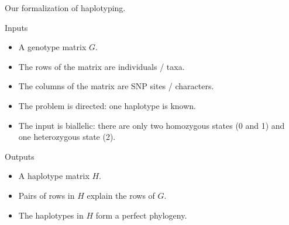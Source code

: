 \documentclass{beamer}
\begin{document}
\begin{frame}[t]{Our formalization of haplotyping.}
  \begin{block}{Inputs}
    \begin{itemize}
    \item A genotype matrix $G$.
    \item The rows of the matrix are individuals / taxa.
    \item The columns of the matrix are SNP sites / characters.
    \item<alert@1->
      The problem is directed: one haplotype is known.
    \item<alert@1->
      The input is biallelic: there are only two homozygous
      states (0 and 1) and one heterozygous state (2).
    \end{itemize}
  \end{block}
  \begin{block}{Outputs}
    \begin{itemize}
    \item A haplotype matrix $H$.
    \item Pairs of rows in $H$ explain the rows of $G$.
    \item<alert@1> The haplotypes in $H$ form a perfect phylogeny.
    \end{itemize}
  \end{block}
\end{frame}
\end{document}
